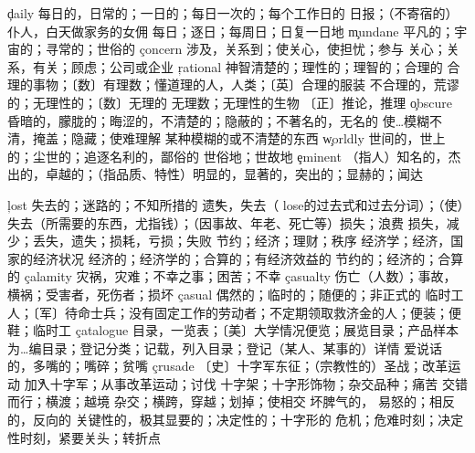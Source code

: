 \begin{multicols}{2}
\c{daily}  \a 每日的，日常的；一日的；每日一次的；每个工作日的 \n 日报；（不寄宿的）仆人，白天做家务的女佣 \ad 每日；逐日；每周日；日复一日地
\c{mundane}  \a 平凡的；宇宙的；寻常的；世俗的
\c{concern}  \vt 涉及，关系到；使关心，使担忧；参与 \n 关心；关系，有关；顾虑；公司或企业
\c{rational}  \a 神智清楚的；理性的；理智的；合理的 \n 合理的事物；〔数〕有理数；懂道理的人，人类；〔英〕合理的服装
  \a 不合理的，荒谬的；无理性的；〔数〕无理的 \n 无理数；无理性的生物
  \n 〔正〕推论，推理
\c{obscure}  \a 昏暗的，朦胧的；晦涩的，不清楚的；隐蔽的；不著名的，无名的 \vt 使…模糊不清，掩盖；隐藏；使难理解 \n 某种模糊的或不清楚的东西
\c{worldly}  \a 世间的，世上的；尘世的；追逐名利的，鄙俗的 \ad 世俗地；世故地
\c{eminent}  \a （指人）知名的，杰出的，卓越的；（指品质、特性）明显的，显著的，突出的；显赫的；闻达

\c{lost}  \a 失去的；迷路的；不知所措的 \v 遗失，失去（ lose的过去式和过去分词）；（使）失去（所需要的东西，尤指钱）；（因事故、年老、死亡等）损失；浪费
  \n 损失，减少；丢失，遗失；损耗，亏损；失败 
  \n 节约；经济；理财；秩序
  \n 经济学；经济，国家的经济状况
  \a 经济的；经济学的；合算的；有经济效益的
  \a 节约的；经济的；合算的
\c{calamity}  \n 灾祸，灾难；不幸之事；困苦；不幸
\c{casualty}  \n 伤亡（人数）；事故，横祸；受害者，死伤者；损坏
\c{casual}  \a 偶然的；临时的；随便的；非正式的 \n 临时工人；〔军〕待命士兵；没有固定工作的劳动者；不定期领取救济金的人；便装；便鞋；临时工
\c{catalogue}  \n 目录，一览表；〔美〕大学情况便览；展览目录；产品样本 \vt 为…编目录；登记分类；记载，列入目录；登记（某人、某事的）详情
  \a 爱说话的，多嘴的；嘴碎；贫嘴
\c{crusade}  \n 〔史〕十字军东征；（宗教性的）圣战；改革运动 \v 加入十字军；从事改革运动；讨伐
  \n 十字架；十字形饰物；杂交品种；痛苦 \vi 交错而行；横渡；越境 \vt 杂交；横跨，穿越；划掉；使相交 \a 坏脾气的， 易怒的；相反的，反向的
  \a 关键性的，极其显要的；决定性的；十字形的
  \n 危机；危难时刻；决定性时刻，紧要关头；转折点 


\end{multicols}
